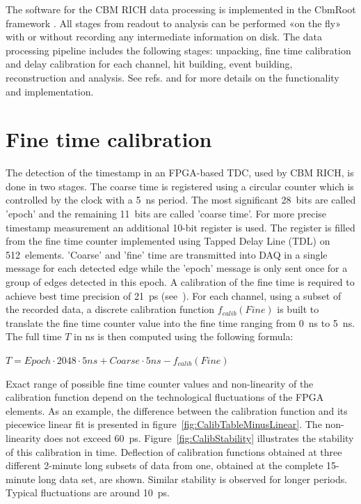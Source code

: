 \documentclass[final,5p,times,twocolumn]{elsarticle}
\begin{document}
The software for the CBM RICH data processing is implemented in the CbmRoot framework \cite{SEMEN}. All stages from readout to analysis can be performed «on the fly» with or without recording any intermediate information on disk. The data processing pipeline includes the following stages: unpacking, fine time calibration and delay calibration for each channel, hit building, event building, reconstruction and analysis. See refs. \cite{PEPAN} and \cite{RINGS} for more details on the functionality and implementation.

\section{Fine time calibration}

The detection of the timestamp in an FPGA-based TDC, used by CBM RICH, is done in two stages. The coarse time is registered using a circular counter which is controlled by the clock with a 5~ns period. The most significant 28~bits are called 'epoch' and the remaining 11~bits are called 'coarse time'. For more precise timestamp measurement an additional 10-bit register is used. The register is filled from the fine time counter implemented using Tapped Delay Line (TDL) on 512~elements.
'Coarse' and 'fine' time are transmitted into DAQ in a single message for each detected edge while the 'epoch' message is only sent once for a group of edges detected in this epoch.
A calibration of the fine time is required to achieve best time precision of 21~ps (see~\cite{FINECALIB,PEPAN}). For each channel, using a subset of the recorded data, a discrete calibration function $ f_{calib}(Fine) $ is built to translate the fine time counter value into the fine time ranging from 0~ns to 5~ns. The full time $ T $ in ns is then computed using the following formula:

{\centering
$ T = Epoch \cdot 2048 \cdot 5ns + Coarse \cdot 5ns - f_{calib}(Fine) $ \\
}

Exact range of possible fine time counter values and non-linearity of the calibration function depend on the technological fluctuations of the FPGA elements. As an example, the difference between the calibration function and its piecewice linear fit is presented in figure~\ref{fig:CalibTableMinusLinear}. The non-linearity does not exceed 60~ps. Figure~\ref{fig:CalibStability} illustrates the stability of this calibration in time. Deflection of calibration functions obtained at three different 2-minute long subsets of data from one, obtained at the complete 15-minute long data set, are shown. Similar stability is observed for longer periods. Typical fluctuations are around 10~ps.
\end{document}
